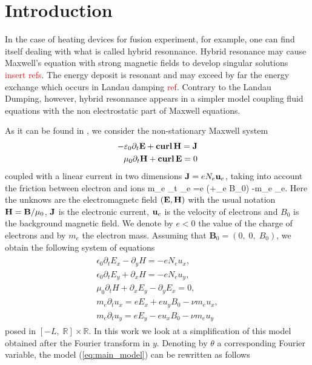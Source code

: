 \section{Introduction}
In the case of heating devices for fusion experiment, for example, 
one can find itself dealing with what is called hybrid resonnance. 
Hybrid resonance may cause Maxwell's equation with strong magnetic 
fields to develop singular solutions \textcolor{red}{insert refs}. 
The energy deposit is resonant and may exceed by far the energy 
exchange which occurs in Landau damping \textcolor{red}{ref}. 
Contrary to the Landau Dumping, however, 
hybrid resonnance appears in a simpler model coupling 
fluid equations with the non electrostatic part of Maxwell equations.


As it can be found in \cite{stable_yee_plasma_current}, we consider the non-stationary Maxwell system  
\begin{align}
-\varepsilon_0 \partial_t {\bf E} + {\bf curl}\, {\bf H} = {\bf J}\\
\mu_0 \partial_t {\bf H} + {\bf curl}\, {\bf E} = 0
\end{align}
coupled with a linear current in two dimensions ${\bf J} = eN_e {\bf u}_e$, taking into account the friction between electron and ions
\be
m_e \partial_t \ubf_e =e (\E +\ubf_e \nabla B_0) -m_e \nu \ubf_e. \label{eq:electronmove}
\ee
Here the unknows are the electromagnetc field $({\bf E},{\bf H})$ with the usual notation ${\bf H} = {\bf B}/\mu_0$, ${\bf J}$ is the electronic current, 
${\bf u}_e$ is the velocity of electrons and $B_0$ is the background magnetic field.  
We denote by $e<0$ the value of the charge of electrons and by $m_e$ the electron mass.
Assuming that $\mathbf{B}_0=\left(0,\; 0,\; B_0\right)$, we obtain the following system of equations 
\begin{align}
\label{eq:main_model}
\begin{split}
\epsilon_0\partial_t E_{x}-\partial_y H=-eN_e u_x,\\
\epsilon_0\partial_t E_{y}+\partial_x H=-eN_e u_y,\\
\mu_0\partial_t H+\partial_x E_y-\partial_y E_x=0,\\
m_e\partial_t u_x=eE_x+eu_yB_0-\nu m_e u_x,\\
m_e\partial_t u_y=eE_y-eu_xB_0-\nu m_e u_y
\end{split}
\end{align}
posed in $[-L,\; \mathbb{R}]\times \mathbb{R}$. 
In this work we look at a simplification of this model obtained after 
the Fourier transform in $y$. Denoting by $\theta$ a corresponding Fourier variable, the model (\ref{eq:main_model}) can be rewritten as follows

